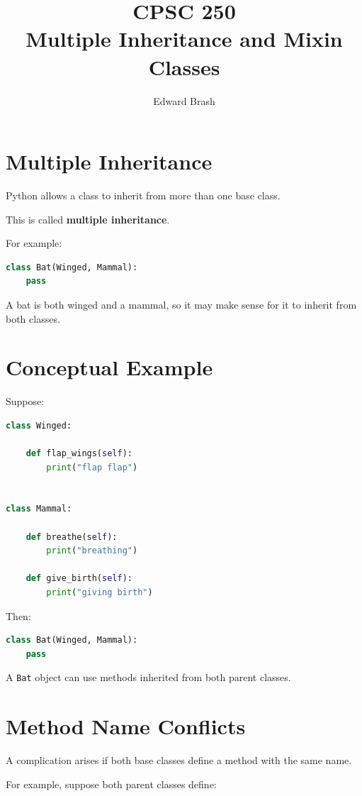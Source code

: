 \documentclass[11pt]{article}
\title{CPSC 250 \\ Multiple Inheritance and Mixin Classes}
\author{Edward Brash}
\date{}
\begin{document}
\maketitle

\section{Multiple Inheritance}

Python allows a class to inherit from more than one base class.

This is called \textbf{multiple inheritance}.

For example:

\begin{lstlisting}[language=Python]
class Bat(Winged, Mammal):
    pass
\end{lstlisting}

A bat is both winged and a mammal, so it may make sense for it to inherit from both classes.

\section{Conceptual Example}

Suppose:

\begin{lstlisting}[language=Python]
class Winged:

    def flap_wings(self):
        print("flap flap")


class Mammal:

    def breathe(self):
        print("breathing")

    def give_birth(self):
        print("giving birth")
\end{lstlisting}

Then:

\begin{lstlisting}[language=Python]
class Bat(Winged, Mammal):
    pass
\end{lstlisting}

A \texttt{Bat} object can use methods inherited from both parent classes.

\section{Method Name Conflicts}

A complication arises if both base classes define a method with the same name.

For example, suppose both parent classes define:
\end{document}
